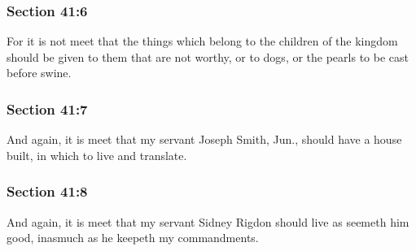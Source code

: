 	\subsubsection{Section 41:6} %
		\label{DC41-6}

		For it is not meet that the things which belong to the children of the kingdom should be given to them that are not worthy, or to dogs, or the pearls to be cast before swine.


	\subsubsection{Section 41:7} %
		\label{DC41-7}

		And again, it is meet that my servant Joseph Smith, Jun., should have a house built, in which to live and translate.


	\subsubsection{Section 41:8} %
		\label{DC41-8}

		And again, it is meet that my servant Sidney Rigdon should live as seemeth him good, inasmuch as he keepeth my commandments.


